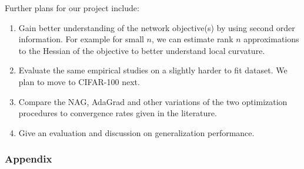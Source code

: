 \documentclass[12pt,english]{article}
\newcommand{\1}{\mathbb{I}} %
\begin{document}
Further plans for our project include:

\begin{enumerate}

\item Gain better understanding of the network objective(s) by using second
order information.  For example for small $n$, we can estimate rank $n$
approximations to the Hessian of the objective to better understand local
curvature.

\item Evaluate the same empirical studies on a slightly harder to fit dataset.
We plan to move to CIFAR-100 next.

\item Compare the NAG, AdaGrad and other variations of the two optimization
procedures to convergence rates given in the literature.

\item Give an evaluation and discussion on generalization performance.

\end{enumerate}

\newpage
\subsubsection*{Appendix}
\end{document}

